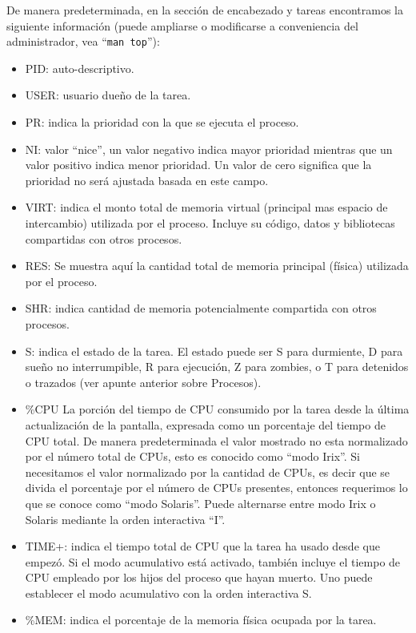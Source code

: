 \documentclass[12pt]{article}
\begin{document}
De manera predeterminada, en la sección de encabezado y tareas encontramos
la siguiente información (puede ampliarse o modificarse a conveniencia del
administrador, vea ``\texttt{man top}''):

\begin{itemize}
\item PID: auto-descriptivo. 
\item USER: usuario dueño de la tarea.
\item PR: indica la prioridad con la que se ejecuta el proceso. 
\item NI: valor ``nice'', un valor negativo indica mayor prioridad mientras
que un valor positivo indica menor prioridad. Un valor de cero significa
que la prioridad no será ajustada basada en este campo. 
\item VIRT: indica el monto total de memoria virtual (principal mas espacio
de intercambio) utilizada por el proceso. Incluye su código, datos y 
bibliotecas compartidas con otros procesos.  
\item RES: Se muestra aquí la cantidad total de memoria principal (física)
 utilizada  por el proceso.  
\item SHR: indica cantidad  de  memoria potencialmente compartida con otros
procesos.
\item S: indica el estado  de  la tarea. El estado puede ser S para 
durmiente, D para sueño no interrumpible, R para ejecución, Z para zombies,
o  T para detenidos o trazados (ver apunte anterior sobre Procesos). 
\item \%CPU La  porción  del  tiempo  de  CPU  consumido por la tarea desde
la última actualización de la pantalla, expresada como un  porcentaje del 
tiempo de CPU total. De manera predeterminada el valor mostrado no esta
normalizado por el número total de CPUs, esto es conocido como 
``modo Irix''. Si necesitamos el valor normalizado por la cantidad de CPUs,
es decir que se divida el porcentaje por el número de CPUs presentes, 
entonces requerimos lo que se conoce como ``modo Solaris''. Puede alternarse
entre modo Irix o Solaris mediante la orden interactiva ``I''. 
\item TIME+: indica el tiempo total de CPU que la tarea ha usado desde que 
empezó. Si el  modo  acumulativo está activado, también incluye el tiempo
de  CPU empleado por los hijos del proceso que hayan muerto. Uno puede
establecer  el  modo  acumulativo  con la orden interactiva  S.  
\item \%MEM: indica el porcentaje de la memoria física ocupada por la tarea.
\end{itemize}
\end{document}

